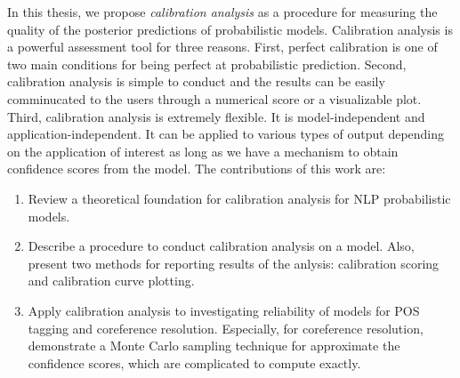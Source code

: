 In this thesis, we propose \textit{calibration analysis} as a procedure for measuring the quality of the posterior predictions of probabilistic models. Calibration analysis is a powerful assessment tool for three reasons. First, perfect calibration is one of two main conditions for being perfect at probabilistic prediction. Second, calibration analysis is simple to conduct and the results can be easily comminucated to the users through a numerical score or a visualizable plot. Third, calibration analysis is extremely flexible. It is model-independent and application-independent. It can be applied to various types of output depending on the application of interest as long as we have a mechanism to obtain confidence scores from the model. The contributions of this work are: 

\begin{enumerate}
  \item Review a theoretical foundation for calibration analysis for NLP probabilistic models.
  \item Describe a procedure to conduct calibration analysis on a model. Also, present two methods for reporting results of the anlysis: calibration scoring and calibration curve plotting.
  \item Apply calibration analysis to investigating reliability of models for POS tagging and coreference resolution. Especially, for coreference resolution, demonstrate a Monte Carlo sampling technique for approximate the confidence scores, which are complicated to compute exactly.   
\end{enumerate}

